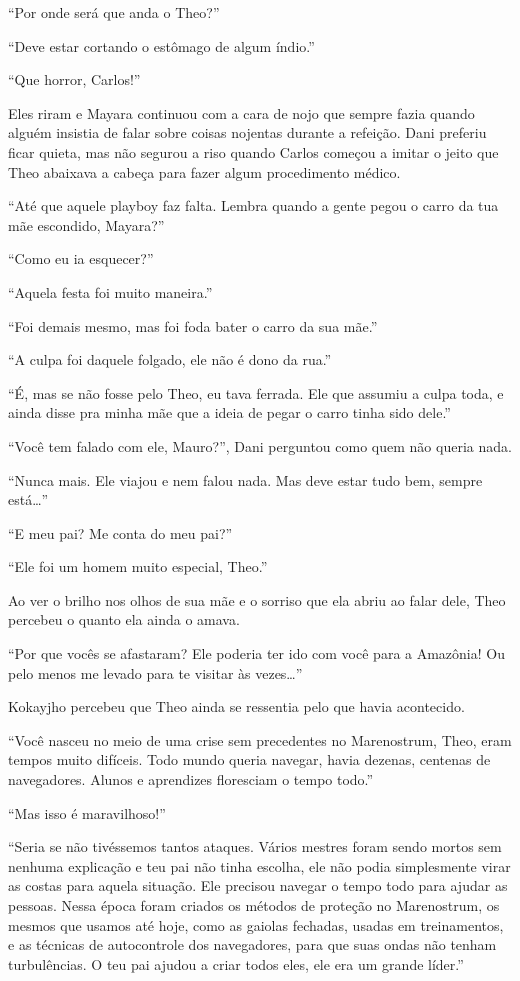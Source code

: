 ``Por onde será que anda o Theo?''

``Deve estar cortando o estômago de algum índio.''

``Que horror, Carlos!''

Eles riram e Mayara continuou com a cara de nojo que sempre fazia quando
alguém insistia de falar sobre coisas nojentas durante a refeição. Dani
preferiu ficar quieta, mas não segurou a riso quando Carlos começou a
imitar o jeito que Theo abaixava a cabeça para fazer algum procedimento
médico.

``Até que aquele playboy faz falta. Lembra quando a gente pegou o carro
da tua mãe escondido, Mayara?''

``Como eu ia esquecer?''

``Aquela festa foi muito maneira.''

``Foi demais mesmo, mas foi foda bater o carro da sua mãe.''

``A culpa foi daquele folgado, ele não é dono da rua.''

``É, mas se não fosse pelo Theo, eu tava ferrada. Ele que assumiu a culpa
toda, e ainda disse pra minha mãe que a ideia de pegar o carro tinha
sido dele.''

``Você tem falado com ele, Mauro?'', Dani perguntou como quem não queria
nada.

``Nunca mais. Ele viajou e nem falou nada. Mas deve estar tudo bem,
sempre está\ldots{}''

\asterisc


``E meu pai? Me conta do meu pai?''

``Ele foi um homem muito especial, Theo.''

Ao ver o brilho nos olhos de sua mãe e o sorriso que ela abriu ao falar
dele, Theo percebeu o quanto ela ainda o amava.

``Por que vocês se afastaram? Ele poderia ter ido com você para a
Amazônia! Ou pelo menos me levado para te visitar às vezes\ldots{}''

Kokayjho percebeu que Theo ainda se ressentia pelo que havia acontecido.

``Você nasceu no meio de uma crise sem precedentes no Marenostrum, Theo,
eram tempos muito difíceis. Todo mundo queria navegar, havia dezenas,
centenas de navegadores. Alunos e aprendizes floresciam o tempo todo.''

``Mas isso é maravilhoso!''

``Seria se não tivéssemos tantos ataques. Vários mestres foram sendo
mortos sem nenhuma explicação e teu pai não tinha escolha, ele não podia
simplesmente virar as costas para aquela situação. Ele precisou navegar
o tempo todo para ajudar as pessoas. Nessa época foram criados os
métodos de proteção no Marenostrum, os mesmos que usamos até hoje, como
as gaiolas fechadas, usadas em treinamentos, e as técnicas de
autocontrole dos navegadores, para que suas ondas não tenham
turbulências. O teu pai ajudou a criar todos eles, ele era um grande
líder.''

